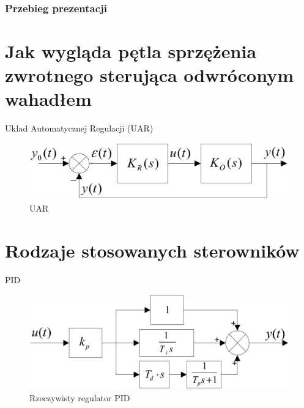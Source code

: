 



\frame{\titlepage}

\begin{frame}
  \frametitle{Przebieg prezentacji}
  \tableofcontents
\end{frame}



\section{Jak wygląda pętla sprzężenia zwrotnego 
    sterująca odwróconym wahadłem}
    
    \begin{frame}{Układ Automatycznej Regulacji (UAR)}
    	\begin{figure}[!htp]
    		\centering
    		\includegraphics[width=\textwidth]{img/uar}
    		\caption{UAR}
    	\end{figure}
    \end{frame}
    

    
\section{Rodzaje stosowanych sterowników}
	\begin{frame}{PID}
    	\begin{figure}[!htp]
    		\centering
    		\includegraphics[width=\textwidth]{img/pid_real}
    		\caption{Rzeczywisty regulator PID}
    	\end{figure}
	\end{frame}
	
